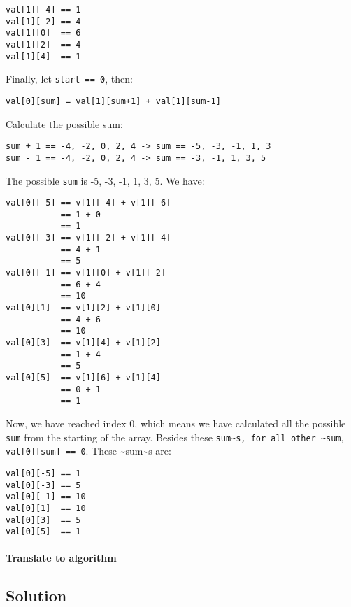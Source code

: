 \documentclass[12pt]{article}
\begin{document}
\begin{verbatim}
val[1][-4] == 1
val[1][-2] == 4
val[1][0]  == 6
val[1][2]  == 4
val[1][4]  == 1
\end{verbatim}
Finally, let \texttt{start == 0}, then:
\begin{verbatim}
val[0][sum] = val[1][sum+1] + val[1][sum-1]
\end{verbatim}
Calculate the possible sum:
\begin{verbatim}
sum + 1 == -4, -2, 0, 2, 4 -> sum == -5, -3, -1, 1, 3
sum - 1 == -4, -2, 0, 2, 4 -> sum == -3, -1, 1, 3, 5
\end{verbatim}
The possible \texttt{sum} is -5, -3, -1, 1, 3, 5. We have:
\begin{verbatim}
val[0][-5] == v[1][-4] + v[1][-6]
           == 1 + 0
           == 1
val[0][-3] == v[1][-2] + v[1][-4]
           == 4 + 1
           == 5
val[0][-1] == v[1][0] + v[1][-2]
           == 6 + 4
           == 10
val[0][1]  == v[1][2] + v[1][0]
           == 4 + 6
           == 10
val[0][3]  == v[1][4] + v[1][2]
           == 1 + 4
           == 5
val[0][5]  == v[1][6] + v[1][4]
           == 0 + 1
           == 1
\end{verbatim}
Now, we have reached index 0, which means we have calculated all the possible \texttt{sum} from the starting of the array. Besides these \texttt{sum\textasciitilde{}s, for all other \textasciitilde{}sum}, \texttt{val[0][sum] == 0}. These \textasciitilde{}sum\textasciitilde{}s are:
\begin{verbatim}
val[0][-5] == 1
val[0][-3] == 5
val[0][-1] == 10
val[0][1]  == 10
val[0][3]  == 5
val[0][5]  == 1
\end{verbatim}
\paragraph{Translate to algorithm}
\label{sec:org7bbe1ad}


























\subsection{Solution}
\label{sec:org132430c}
\end{document}
